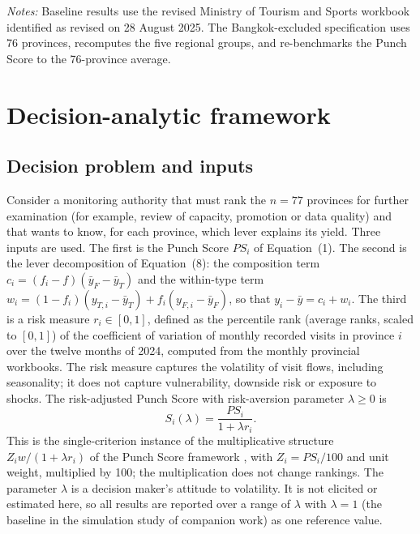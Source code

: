 \documentclass[11pt,a4paper]{article}
\newcommand{\PS}{\mathit{PS}}
\theoremstyle{plain}\newtheorem{proposition}{Proposition}
\theoremstyle{definition}\newtheorem{definition}{Definition}
\begin{document}
\begin{table}[t]\centering\small
\caption{Robustness of the main results, 2024}\label{tab:robust}
\resizebox{\textwidth}{!}{}\par\smallskip
\parbox{\textwidth}{\scriptsize\emph{Notes:} Baseline results use the revised Ministry of Tourism and Sports workbook identified as revised on 28 August 2025. The Bangkok-excluded specification uses 76 provinces, recomputes the five regional groups, and re-benchmarks the Punch Score to the 76-province average.}
\end{table}

\section{Decision-analytic framework}\label{sec:dss}
\subsection{Decision problem and inputs}
Consider a monitoring authority that must rank the $n=77$ provinces for further examination (for example, review of capacity, promotion or data quality) and that wants to know, for each province, which lever explains its yield. Three inputs are used. The first is the Punch Score $\PS_i$ of Equation~(1). The second is the lever decomposition of Equation~(8): the composition term $c_i=(f_i-f)(\bar y_F-\bar y_T)$ and the within-type term $w_i=(1-f_i)(y_{T,i}-\bar y_T)+f_i(y_{F,i}-\bar y_F)$, so that $y_i-\bar y=c_i+w_i$. The third is a risk measure $r_i\in[0,1]$, defined as the percentile rank (average ranks, scaled to $[0,1]$) of the coefficient of variation of monthly recorded visits in province $i$ over the twelve months of 2024, computed from the monthly provincial workbooks. The risk measure captures the volatility of visit flows, including seasonality; it does not capture vulnerability, downside risk or exposure to shocks. The risk-adjusted Punch Score with risk-aversion parameter $\lambda\ge0$ is
\begin{equation}
S_i(\lambda)=\frac{\PS_i}{1+\lambda r_i}.
\end{equation}
This is the single-criterion instance of the multiplicative structure $Z_iw/(1+\lambda r_i)$ of the Punch Score framework \citep{anon2026b,anon2026}, with $Z_i=\PS_i/100$ and unit weight, multiplied by 100; the multiplication does not change rankings. The parameter $\lambda$ is a decision maker's attitude to volatility. It is not elicited or estimated here, so all results are reported over a range of $\lambda$ with $\lambda=1$ (the baseline in the simulation study of companion work) as one reference value.
\end{document}
